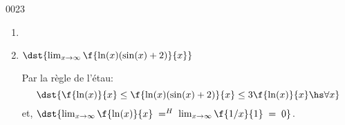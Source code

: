 \begin{corrige}{0023}
\begin{alternative}
\begin{enumerate}
		\item 

		  \item $\dst{\lim_{x\rightarrow \infty} \f{\ln(x)(\sin(x)+2)}{x}}$\hs
		 
		 Par la règle de l'étau:\[\dst{\f{\ln(x)}{x} \leq \f{\ln(x)(\sin(x)+2)}{x} \leq 3\f{\ln(x)}{x} \hs \forall x}\]
		 et, $\dst{\lim_{x\rightarrow \infty} \f{\ln(x)}{x} \; =^H \; \lim_{x\rightarrow \infty} \f{1/x}{1}  \;=\;0}$.
		 
	\end{enumerate}
\end{alternative}

\end{corrige}
